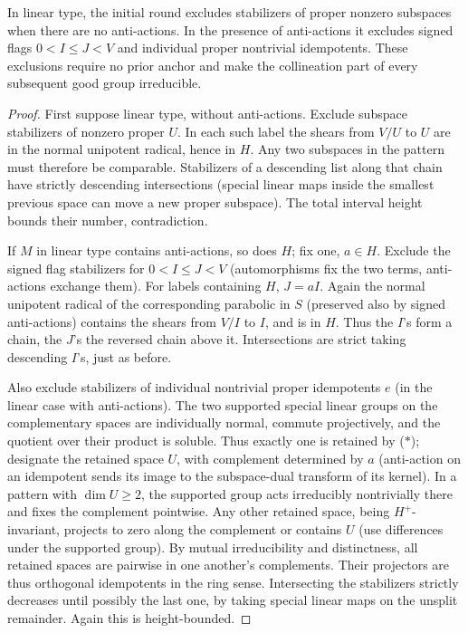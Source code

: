 \begin{proposition}\label{c:linear-subspaces}
In linear type, the initial round excludes stabilizers of proper nonzero subspaces when there are no anti-actions. In the presence of anti-actions it excludes signed flags \(0<I\le J<V\) and individual proper nontrivial idempotents. These exclusions require no prior anchor and make the collineation part of every subsequent good group irreducible.
\end{proposition}

\begin{proof}
First suppose linear type, without anti-actions. Exclude subspace stabilizers of nonzero proper \(U\). In each such label the shears from \(V/U\) to \(U\) are in the normal unipotent radical, hence in \(H\). Any two subspaces in the pattern must therefore be comparable. Stabilizers of a descending list along that chain have strictly descending intersections (special linear maps inside the smallest previous space can move a new proper subspace). The total interval height bounds their number, contradiction.

If \(M\) in linear type contains anti-actions, so does \(H\); fix one, \(a\in H\). Exclude the signed flag stabilizers for \(0<I\le J<V\) (automorphisms fix the two terms, anti-actions exchange them). For labels containing \(H\), \(J=aI\). Again the normal unipotent radical of the corresponding parabolic in \(S\) (preserved also by signed anti-actions) contains the shears from \(V/I\) to \(I\), and is in \(H\). Thus the \(I\)'s form a chain, the \(J\)'s the reversed chain above it. Intersections are strict taking descending \(I\)'s, just as before.

Also exclude stabilizers of individual nontrivial proper idempotents \(e\) (in the linear case with anti-actions). The two supported special linear groups on the complementary spaces are individually normal, commute projectively, and the quotient over their product is soluble. Thus exactly one is retained by (\(*\)); designate the retained space \(U\), with complement determined by \(a\) (anti-action on an idempotent sends its image to the subspace-dual transform of its kernel). In a pattern with \(\dim U\ge2\), the supported group acts irreducibly nontrivially there and fixes the complement pointwise. Any other retained space, being \(H^+\)-invariant, projects to zero along the complement or contains \(U\) (use differences under the supported group). By mutual irreducibility and distinctness, all retained spaces are pairwise in one another's complements. Their projectors are thus orthogonal idempotents in the ring sense. Intersecting the stabilizers strictly decreases until possibly the last one, by taking special linear maps on the unsplit remainder. Again this is height-bounded.


\end{proof}
